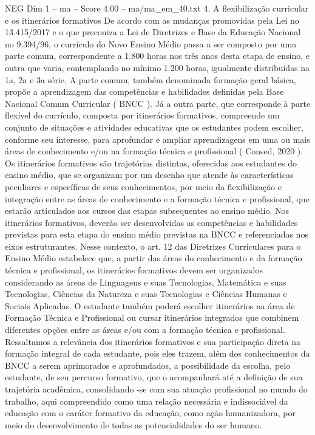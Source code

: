 \begin{textsample}{NEG Dim 1 – ma – Score 4.00 – ma/ma\_em\_40.txt}  \label{ex:f1_neg_222}
4.
A flexibilização curricular e os itinerários formativos De acordo com as mudanças promovidas pela Lei no 13.415/2017 e o que preconiza a Lei de Diretrizes e Base da Educação Nacional no 9.394/96, o currículo do Novo Ensino Médio passa a ser composto por uma parte comum, correspondente a 1.800 horas nos três anos desta etapa de ensino, e outra que varia, contemplando no mínimo 1.200 horas, igualmente distribuídas na 1a, 2a e 3a série.
A parte comum, também denominada formação geral básica, propõe a aprendizagem das competências e habilidades definidas pela Base Nacional Comum Curricular ( BNCC ).
Já a outra parte, que corresponde à parte flexível do currículo, composta por itinerários formativos, compreende um conjunto de situações e atividades educativas que os estudantes podem escolher, conforme seu interesse, para aprofundar e ampliar aprendizagens em uma ou mais áreas de conhecimento e/ou na formação técnica e profissional ( Consed, 2020 ).
Os itinerários formativos são trajetórias distintas, oferecidas aos estudantes do ensino médio, que se organizam por um desenho que atende às características peculiares e específicas de seus conhecimentos, por meio da flexibilização e integração entre as áreas de conhecimento e a formação técnica e profissional, que estarão articulados aos cursos das etapas subsequentes ao ensino médio.
Nos itinerários formativos, deverão ser desenvolvidas as competências e habilidades previstas para esta etapa do ensino médio previstas na BNCC e referenciadas nos eixos estruturantes.
Nesse contexto, o art. 12 das Diretrizes Curriculares para o Ensino Médio estabelece que, a partir das áreas do conhecimento e da formação técnica e profissional, os itinerários formativos devem ser organizados considerando as áreas de Linguagens e suas Tecnologias, Matemática e suas Tecnologias, Ciências da Natureza e suas Tecnologias e Ciências Humanas e Sociais Aplicadas.
O estudante também poderá escolher itinerários na área de Formação Técnica e Profissional ou cursar itinerários integrados que combinem diferentes opções entre as áreas e/ou com a formação técnica e profissional.
Ressaltamos a relevância dos itinerários formativos e sua participação direta na formação integral de cada estudante, pois eles trazem, além dos conhecimentos da BNCC a serem aprimorados e aprofundados, a possibilidade da escolha, pelo estudante, de seu percurso formativo, que o acompanhará até a definição de sua trajetória acadêmica, consolidando -se com sua atuação profissional no mundo do trabalho, aqui compreendido como uma relação necessária e indissociável da educação com o caráter formativo da educação, como ação humanizadora, por meio do desenvolvimento de todas as potencialidades do ser humano.

\end{textsample}
